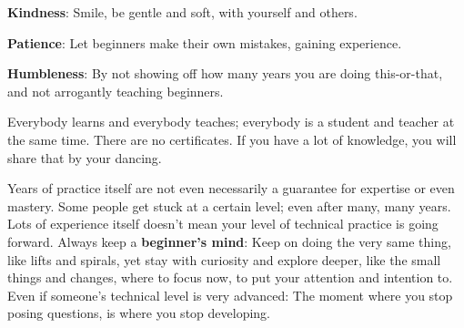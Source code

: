 \begin{itemize*}
    \item [] \textbf{Kindness}: Smile, be gentle and soft, with yourself and others.
    \item [] \textbf{Patience}: Let beginners make their own mistakes, gaining experience.
    \item [] \textbf{Humbleness}: By not showing off how many years you are doing this-or-that, and not arrogantly teaching beginners.
\end{itemize*}

Everybody learns and everybody teaches; everybody is a student and teacher at the same time.
There are no certificates.
If you have a lot of knowledge, you will share that by your dancing.

Years of practice itself are not even necessarily a guarantee for expertise or even mastery.
Some people get stuck at a certain level; even after many, many years.
Lots of experience itself doesn't mean your level of technical practice is going forward.
Always keep a \textbf{beginner's mind}: Keep on doing the very same thing, like lifts and spirals, yet stay with curiosity and explore deeper, like the small things and changes, where to focus now, to put your attention and intention to.
Even if someone's technical level is very advanced: The moment where you stop posing questions, is where you stop developing.


